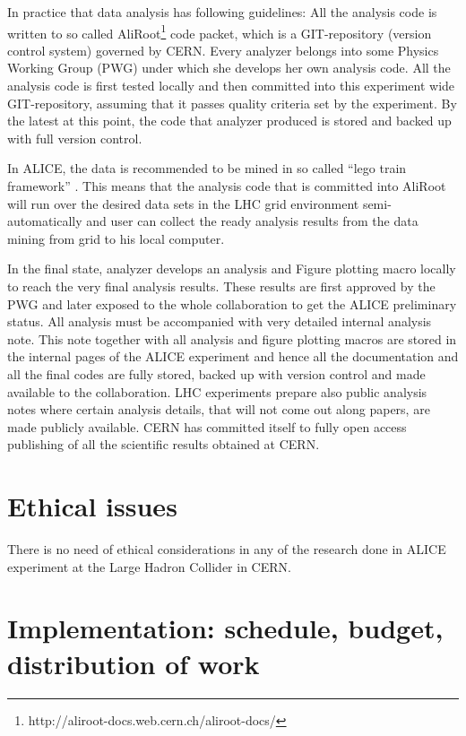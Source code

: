 In practice that data analysis has following guidelines: All the analysis code is written to so called AliRoot\footnote{http://aliroot-docs.web.cern.ch/aliroot-docs/} code packet, which is a GIT-repository (version control system) governed by CERN. Every analyzer belongs into some Physics Working Group (PWG) under which she develops her own analysis code. All the analysis code is first tested locally and then committed into this experiment wide GIT-repository, assuming that it passes quality criteria set by the experiment. By the latest at this point, the code that analyzer produced is stored and backed up with full version control. 

In ALICE, the data is recommended to be mined in so called ``lego train framework'' \cite{Zimmermann:2015owa}. This means that the analysis code that is committed into AliRoot will run over the desired data sets in the LHC grid environment semi-automatically and user can collect the ready analysis results from the data mining from grid to his local computer.

In the final state, analyzer develops an analysis and Figure plotting macro locally to reach the very final analysis results. These results are first approved by the PWG and later exposed to the whole collaboration to get the ALICE preliminary status. All analysis must be accompanied with very detailed internal analysis note. This note together with all analysis and figure plotting macros are stored in the internal pages of the ALICE experiment and hence all the documentation and all the final codes are fully stored, backed up with version control and made available to the collaboration. LHC experiments prepare also public analysis notes where certain analysis details, that will not come out along papers, are made publicly available. CERN has committed itself to fully open access publishing of all the scientific results obtained at CERN.

\section{Ethical issues}

There is no need of ethical considerations in any of the research done in ALICE experiment at the Large Hadron Collider in CERN.


\section{Implementation: schedule, budget, distribution of work} %
\label{sec:implementation}

